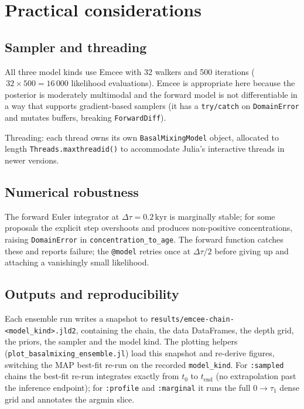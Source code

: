\documentclass[11pt,a4paper]{article}
\newcommand{\tzero}{\ensuremath{t_{0}}}
\newcommand{\tend}{\ensuremath{t_{\mathrm{end}}}}
\newcommand{\code}[1]{\texttt{#1}}
\begin{document}
\section{Practical considerations}

\subsection{Sampler and threading}

All three model kinds use Emcee with 32 walkers and 500 iterations
($\,32\times500=16\,000$ likelihood evaluations). Emcee is appropriate here
because the posterior is moderately multimodal and the forward model is not
differentiable in a way that supports gradient-based samplers (it has a
\code{try/catch} on \code{DomainError} and mutates buffers, breaking
\code{ForwardDiff}).

Threading: each thread owns its own \code{BasalMixingModel} object, allocated
to length \code{Threads.maxthreadid()} to accommodate Julia's interactive
threads in newer versions.

\subsection{Numerical robustness}

The forward Euler integrator at $\Delta \tau=0.2\,\mathrm{kyr}$ is marginally
stable; for some proposals the explicit step overshoots and produces
non-positive concentrations, raising \code{DomainError} in
\code{concentration\_to\_age}. The forward function catches these and reports
failure; the \code{@model} retries once at $\Delta \tau/2$ before giving up
and attaching a vanishingly small likelihood.

\subsection{Outputs and reproducibility}

Each ensemble run writes a snapshot to
\code{results/emcee-chain-<model\_kind>.jld2}, containing the chain, the data
DataFrames, the depth grid, the priors, the sampler and the model kind. The
plotting helpers (\code{plot\_basalmixing\_ensemble.jl}) load this snapshot
and re-derive figures, switching the MAP best-fit re-run on the recorded
\code{model\_kind}. For \code{:sampled} chains the best-fit re-run
integrates exactly from \tzero{} to \tend{} (no extrapolation past the
inference endpoint); for \code{:profile} and \code{:marginal} it runs the
full $0 \to \tau_1$ dense grid and annotates the argmin slice.
\end{document}
